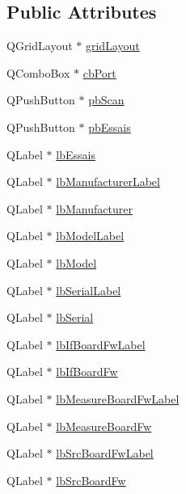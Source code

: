 \subsection*{Public Attributes}
\begin{DoxyCompactItemize}
\item 
Q\-Grid\-Layout $\ast$ \hyperlink{class_ui__mdt_device_u3606_a_widget_a871b058c9e2947eb66cec371a748fb46}{grid\-Layout}
\item 
Q\-Combo\-Box $\ast$ \hyperlink{class_ui__mdt_device_u3606_a_widget_a51ce31dee140a06dbbf5c855c4663a2f}{cb\-Port}
\item 
Q\-Push\-Button $\ast$ \hyperlink{class_ui__mdt_device_u3606_a_widget_ab0c0a93358a9d07107fbbce8c82bb9f1}{pb\-Scan}
\item 
Q\-Push\-Button $\ast$ \hyperlink{class_ui__mdt_device_u3606_a_widget_a1e9e1ea2fdd310f5053c7e8833eb57ee}{pb\-Essais}
\item 
Q\-Label $\ast$ \hyperlink{class_ui__mdt_device_u3606_a_widget_ac7d0f6c08fc5a943d234225a56079867}{lb\-Essais}
\item 
Q\-Label $\ast$ \hyperlink{class_ui__mdt_device_u3606_a_widget_a3a9a3b140349a4f4fcf9897f930d142b}{lb\-Manufacturer\-Label}
\item 
Q\-Label $\ast$ \hyperlink{class_ui__mdt_device_u3606_a_widget_abb92b3838819db278ae17886f4da0f4e}{lb\-Manufacturer}
\item 
Q\-Label $\ast$ \hyperlink{class_ui__mdt_device_u3606_a_widget_a78afbde880c66d87423a21efce6f6002}{lb\-Model\-Label}
\item 
Q\-Label $\ast$ \hyperlink{class_ui__mdt_device_u3606_a_widget_a9d84ce92d16a709a163a6621e6b8a1ee}{lb\-Model}
\item 
Q\-Label $\ast$ \hyperlink{class_ui__mdt_device_u3606_a_widget_abdff7cf61e6f613b24d1799522c0e357}{lb\-Serial\-Label}
\item 
Q\-Label $\ast$ \hyperlink{class_ui__mdt_device_u3606_a_widget_a268a390c071e035acaa2f1b4d211bc31}{lb\-Serial}
\item 
Q\-Label $\ast$ \hyperlink{class_ui__mdt_device_u3606_a_widget_ad11e8aded543cc1eeaaaf3e6753089d3}{lb\-If\-Board\-Fw\-Label}
\item 
Q\-Label $\ast$ \hyperlink{class_ui__mdt_device_u3606_a_widget_af7898574daf7278c6eedbcfabc4dd715}{lb\-If\-Board\-Fw}
\item 
Q\-Label $\ast$ \hyperlink{class_ui__mdt_device_u3606_a_widget_a495247df2ff7229a0f199926bafbc1d2}{lb\-Measure\-Board\-Fw\-Label}
\item 
Q\-Label $\ast$ \hyperlink{class_ui__mdt_device_u3606_a_widget_a0e3a19572ce44c827c5f2c8cdd910aac}{lb\-Measure\-Board\-Fw}
\item 
Q\-Label $\ast$ \hyperlink{class_ui__mdt_device_u3606_a_widget_a9e876113b12bbbd2b43a0e057ad577d0}{lb\-Src\-Board\-Fw\-Label}
\item 
Q\-Label $\ast$ \hyperlink{class_ui__mdt_device_u3606_a_widget_a7e48af183581a6be283f8fef932e8ec0}{lb\-Src\-Board\-Fw}
\end{DoxyCompactItemize}



